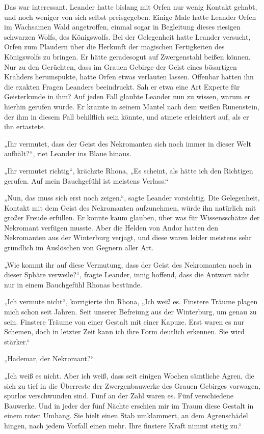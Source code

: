 \documentclass[10pt, a4paper, oneside]{book}
\begin{document}
Das war interessant. Leander hatte bislang mit Orfen nur wenig Kontakt gehabt, und noch weniger von sich selbst preisgegeben. Einige Male hatte Leander Orfen im Wachsamen Wald angetroffen, einmal sogar in Begleitung dieses riesigen schwarzen Wolfs, des Königswolfs. Bei der Gelegenheit hatte Leander versucht, Orfen zum Plaudern über die Herkunft der magischen Fertigkeiten des Königswolfs zu bringen. Er hätte geradesogut auf Zwergenstahl beißen können. Nur zu den Gerüchten, dass im Grauen Gebirge der Geist eines bösartigen Krahders herumspukte, hatte Orfen etwas verlauten lassen. Offenbar hatten ihn die exakten Fragen Leanders beeindruckt. Sah er etwa eine Art Experte für Geisterkunde in ihm? Auf jeden Fall glaubte Leander nun zu wissen, warum er hierhin gerufen wurde. Er kramte in seinem Mantel nach dem weißen Runenstein, der ihm in diesem Fall behilflich sein könnte, und atmete erleichtert auf, als er ihn ertastete.

„Ihr vermutet, dass der Geist des Nekromanten sich noch immer in dieser Welt aufhält?“, riet Leander ins Blaue hinaus.

„Ihr vermutet richtig“, krächzte Rhona, „Es scheint, als hätte ich den Richtigen gerufen. Auf mein Bauchgefühl ist meistens Verlass.“

„Nun, das muss sich erst noch zeigen.“, sagte Leander vorsichtig. Die Gelegenheit, Kontakt mit dem Geist des Nekromanten aufzunehmen, würde ihn natürlich mit großer Freude erfüllen. Er konnte kaum glauben, über was für Wissensschätze der Nekromant verfügen musste. Aber die Helden von Andor hatten den Nekromanten aus der Winterburg verjagt, und diese waren leider meistens sehr gründlich im Auslöschen von Gegnern aller Art.

„Wie kommt ihr auf diese Vermutung, dass der Geist des Nekromanten noch in dieser Sphäre verweile?“, fragte Leander, innig hoffend, dass die Antwort nicht nur in einem Bauchgefühl Rhonas bestünde.

„Ich vermute nicht“, korrigierte ihn Rhona, „Ich weiß es. Finstere Träume plagen mich schon seit Jahren. Seit unserer Befreiung aus der Winterburg, um genau zu sein. Finstere Träume von einer Gestalt mit einer Kapuze. Erst waren es nur Schemen, doch in letzter Zeit kann ich ihre Form deutlich erkennen. Sie wird stärker.“

„Hademar, der Nekromant?“

„Ich weiß es nicht. Aber ich weiß, dass seit einigen Wochen sämtliche Agren, die sich zu tief in die Überreste der Zwergenbauwerke des Grauen Gebirges vorwagen, spurlos verschwunden sind. Fünf an der Zahl waren es. Fünf verschiedene Bauwerke. Und in jeder der fünf Nächte erschien mir im Traum diese Gestalt in einem roten Umhang. Sie hielt einen Stab umklammert, an dem Agrenschädel hingen, nach jedem Vorfall einen mehr. Ihre finstere Kraft nimmt stetig zu.“
\end{document}
